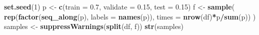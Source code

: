 \documentclass[
]{book}
\newenvironment{Shaded}{\begin{snugshade}}{\end{snugshade}}
\newcommand{\DataTypeTok}[1]{\textcolor[rgb]{0.13,0.29,0.53}{#1}}
\newcommand{\DecValTok}[1]{\textcolor[rgb]{0.00,0.00,0.81}{#1}}
\newcommand{\FloatTok}[1]{\textcolor[rgb]{0.00,0.00,0.81}{#1}}
\newcommand{\KeywordTok}[1]{\textcolor[rgb]{0.13,0.29,0.53}{\textbf{#1}}}
\newcommand{\NormalTok}[1]{#1}
\newcommand{\OperatorTok}[1]{\textcolor[rgb]{0.81,0.36,0.00}{\textbf{#1}}}
\newcommand{\StringTok}[1]{\textcolor[rgb]{0.31,0.60,0.02}{#1}}
\theoremstyle{break}
\theoremstyle{definition}
\theoremstyle{definition}
\theoremstyle{definition}
\theoremstyle{remark}
\begin{document}
\begin{Shaded}
\begin{Highlighting}[]
\KeywordTok{set.seed}\NormalTok{(}\DecValTok{1}\NormalTok{)}
\NormalTok{p <-}\StringTok{ }\KeywordTok{c}\NormalTok{(}\DataTypeTok{train =} \FloatTok{0.7}\NormalTok{, }\DataTypeTok{validate =} \FloatTok{0.15}\NormalTok{, }\DataTypeTok{test =} \FloatTok{0.15}\NormalTok{)}
\NormalTok{f <-}\StringTok{ }\KeywordTok{sample}\NormalTok{( }\KeywordTok{rep}\NormalTok{(}\KeywordTok{factor}\NormalTok{(}\KeywordTok{seq_along}\NormalTok{(p), }\DataTypeTok{labels =} \KeywordTok{names}\NormalTok{(p)),}
                 \DataTypeTok{times =} \KeywordTok{nrow}\NormalTok{(df)}\OperatorTok{*}\NormalTok{p}\OperatorTok{/}\KeywordTok{sum}\NormalTok{(p)) )}
\NormalTok{samples <-}\StringTok{ }\KeywordTok{suppressWarnings}\NormalTok{(}\KeywordTok{split}\NormalTok{(df, f))}
\KeywordTok{str}\NormalTok{(samples)}
\end{Highlighting}
\end{Shaded}
\end{document}
